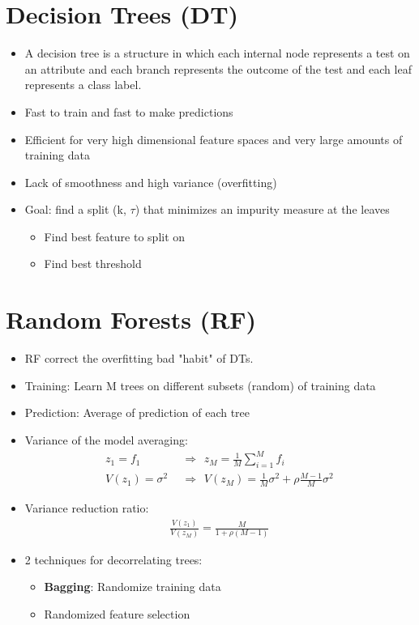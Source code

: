 \section{Decision Trees (DT)}
\begin{itemize}
    \item A decision tree is a structure in which each internal node represents a test on an attribute and each branch represents the outcome of the test and each leaf represents a class label.
    \item Fast to train and fast to make predictions
    \item Efficient for very high dimensional feature spaces and very large amounts of training data
    \item Lack of smoothness and high variance (overfitting)
    \item Goal: find a split (k, $\tau$) that minimizes an impurity measure at the leaves
    \begin{itemize}
        \item Find best feature to split on
        \item Find best threshold
    \end{itemize}
\end{itemize}

\section{Random Forests (RF)}
\begin{itemize}
    \item RF correct the overfitting bad "habit" of DTs.
    \item Training: Learn M trees on different subsets (random) of training data
    \item Prediction: Average of prediction of each tree
    \item Variance of the model averaging:
    \begin{align*}
        z_1 = f_1 \hspace{5pt} &\Rightarrow \hspace{5pt} z_M = \frac{1}{M} \sum_{i = 1}^M f_i \\
        V(z_1) = \sigma^2 \hspace{5pt} &\Rightarrow \hspace{5pt} V(z_M) = \frac{1}{M} \sigma^2 + \rho \frac{M - 1}{M} \sigma^2
    \end{align*}
    \item Variance reduction ratio:
    \begin{align*}
        \frac{V(z_1)}{V(z_M)} = \frac{M}{1 +\rho (M - 1)}
    \end{align*}
    \item 2 techniques for decorrelating trees:
    \begin{itemize}
        \item \textbf{Bagging}: Randomize training data
        \item Randomized feature selection
    \end{itemize}
\end{itemize}

